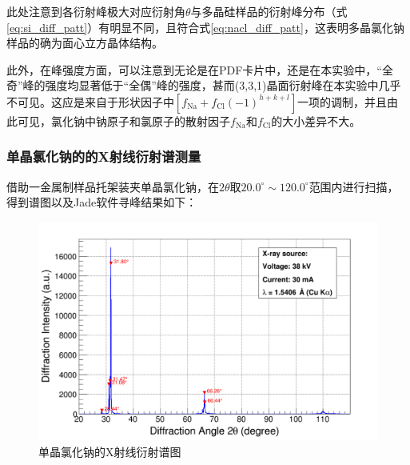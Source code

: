 \documentclass{thuemp}
\begin{document}
此处注意到各衍射峰极大对应衍射角$\theta$与多晶硅样品的衍射峰分布（式\ref{eq:si_diff_patt}）有明显不同，且符合式\ref{eq:nacl_diff_patt}，这表明多晶氯化钠样品的确为面心立方晶体结构。

此外，在峰强度方面，可以注意到无论是在PDF卡片中，还是在本实验中，“全奇”峰的强度均显著低于“全偶”峰的强度，甚而(3,3,1)晶面衍射峰在本实验中几乎不可见。这应是来自于形状因子中$\left[f_\text{Na} + f_\text{Cl} (-1)^{h+k+l}\right]$一项的调制，并且由此可见，氯化钠中钠原子和氯原子的散射因子$f_\text{Na}$和$f_\text{Cl}$的大小差异不大。

\subsubsection{单晶氯化钠的的X射线衍射谱测量}

借助一金属制样品托架装夹单晶氯化钠，在$2\theta$取$20.0^\circ \sim 120.0^\circ$范围内进行扫描，得到谱图以及Jade软件寻峰结果如下：

\begin{figure}[H]
    \centering
    \includegraphics[width=0.8\linewidth]{../Data/NaCl-single.png}
    \caption{单晶氯化钠的X射线衍射谱图}
    \label{fig:nacl_xrd_single}
\end{figure}
\end{document}
